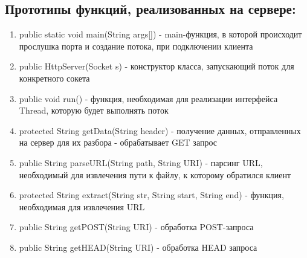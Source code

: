 \documentclass[a4paper,12pt]{extarticle}
\begin{document}
\subsection{Прототипы функций, реализованных на сервере:}
\begin{enumerate}
\item public static void main(String args[]) - main-функция, в которой происходит прослушка порта и создание потока, при подключении клиента
\item public HttpServer(Socket s) - конструктор класса, запускающий поток для конкретного сокета
\item public void run() - функция, необходимая для реализации интерфейса Thread, которую будет выполнять поток
\item protected String getData(String header) - получение данных, отправленных на сервер для их разбора - обрабатывает GET запрос
\item public String parseURL(String path, String URI) - парсинг URL, необходимый для извлечения пути к файлу, к которому обратился клиент
\item protected String extract(String str, String start, String end) - функция, необходимая для извлечения URL
\item public String getPOST(String URI) - обработка POST-запроса
\item public String getHEAD(String URI) - обработка HEAD запроса
\end{enumerate}
\end{document}
